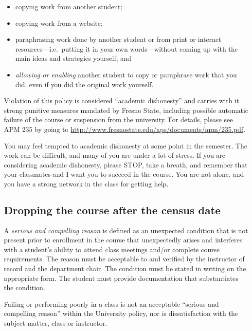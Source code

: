 \begin{itemize}
\tightlist
\item
  copying work from another student;
\item
  copying work from a website;
\item
  paraphrasing work done by another student or from print or internet
  resources---i.e.~putting it in your own words---without coming up with
  the main ideas and strategies yourself; and
\item
  \emph{allowing or enabling} another student to copy or paraphrase work
  that you did, even if you did the original work yourself.
\end{itemize}

Violation of this policy is considered ``academic dishonesty'' and
carries with it strong punitive measures mandated by Fresno State,
including possible automatic failure of the course or suspension from
the university. For details, please see APM 235 by going to
\url{http://www.fresnostate.edu/aps/documents/apm/235.pdf}.

You may feel tempted to academic dishonesty at some point in the
semester. The work can be difficult, and many of you are under a lot of
stress. If you are considering academic dishonesty, please STOP, take a
breath, and remember that your classmates and I want you to succeed in
the course. You are not alone, and you have a strong network in the
class for getting help.

\hypertarget{dropping-the-course-after-the-census-date}{%
\subsection{Dropping the course after the census
date}\label{dropping-the-course-after-the-census-date}}

A \emph{serious and compelling reason} is defined as an unexpected
condition that is not present prior to enrollment in the course that
unexpectedly arises and interferes with a student's ability to attend
class meetings and/or complete course requirements. The reason must be
acceptable to and verified by the instructor of record and the
department chair. The condition must be stated in writing on the
appropriate form. The student must provide documentation that
substantiates the condition.

Failing or performing poorly in a class is not an acceptable ``serious
and compelling reason'' within the University policy, nor is
dissatisfaction with the subject matter, class or instructor.

